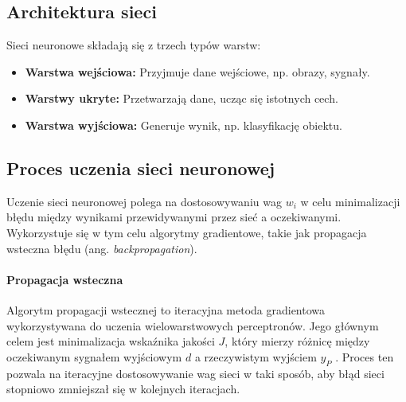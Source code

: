 \documentclass[a4paper,twoside,12pt]{book}
\begin{document}
\newpage

\subsection{Architektura sieci}
Sieci neuronowe składają się z trzech typów warstw:
\begin{itemize}
    \item \textbf{Warstwa wejściowa:} Przyjmuje dane wejściowe, np. obrazy, sygnały.
    \item \textbf{Warstwy ukryte:} Przetwarzają dane, ucząc się istotnych cech.
    \item \textbf{Warstwa wyjściowa:} Generuje wynik, np. klasyfikację obiektu.
\end{itemize}

\subsection{Proces uczenia sieci neuronowej}
Uczenie sieci neuronowej polega na dostosowywaniu wag \(w_i\) w celu minimalizacji błędu między wynikami przewidywanymi przez sieć a oczekiwanymi. Wykorzystuje się w tym celu algorytmy gradientowe, takie jak propagacja wsteczna błędu (ang. \textit{backpropagation}).

\paragraph{Propagacja wsteczna}
Algorytm propagacji wstecznej  to iteracyjna metoda gradientowa wykorzystywana do uczenia wielowarstwowych perceptronów. Jego głównym celem jest minimalizacja wskaźnika jakości \( J \), który mierzy różnicę między oczekiwanym sygnałem wyjściowym \( d \) a rzeczywistym wyjściem \( y_P \) \cite{bib:fujarewicz}. Proces ten pozwala na iteracyjne dostosowywanie wag sieci w taki sposób, aby błąd sieci stopniowo zmniejszał się w kolejnych iteracjach.
\end{document}
